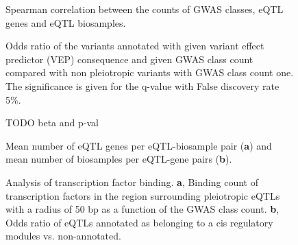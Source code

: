 \begin{backmatter}
    \begin{figure}[h!]
        \caption{Spearman correlation between the counts of GWAS classes, eQTL genes and eQTL biosamples.}
        \label{fig:correlation_counts}
    \end{figure}

%
%

    \begin{figure}[h!]
        \caption{Odds ratio of the variants annotated with given variant effect
        predictor (VEP) consequence and given GWAS class count compared with non
        pleiotropic variants with GWAS class count one. The significance is given for the
        q-value with False discovery rate 5\%.}
        \label{fig:vep_consequence}
    \end{figure}

%
%

    \begin{figure}[h!]
        \caption{TODO beta and p-val}
        \label{fig:beta_pval}
    \end{figure}

%
%

    \begin{figure}[h!]
        \caption{Mean number of eQTL genes per eQTL-biosample pair (\textbf{a}) and mean number of biosamples per eQTL-gene pairs (\textbf{b}).} \label{fig:gwas_egene_etisue_per_variant}
    \end{figure}

%
%

    \begin{figure}[h!]
        \caption{Analysis of transcription factor binding.
        \textbf{a}, Binding count of transcription factors in the region surrounding pleiotropic eQTLs with a radius of 50 bp as a function of the GWAS class count.
        \textbf{b}, Odds ratio of eQTLs annotated as belonging to a cis regulatory modules vs. non-annotated.}
        \label{fig:freq_tf_per_variant}
    \end{figure}


\end{backmatter}
